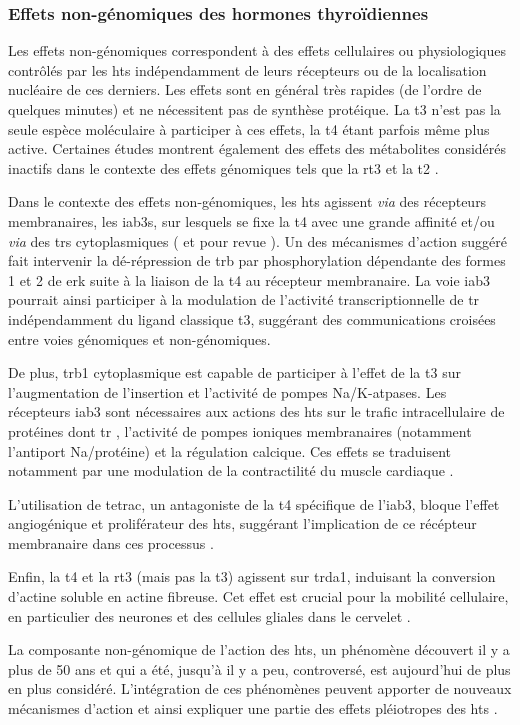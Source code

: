 \documentclass[../main.tex]{subfiles}
\begin{document}
		\subsubsection{Effets non-génomiques des hormones thyroïdiennes}
			Les effets non-génomiques correspondent à des effets cellulaires ou physiologiques contrôlés par les \glspl{ht} indépendamment de leurs récepteurs ou de la localisation nucléaire de ces derniers.
			Les effets sont en général très rapides (de l'ordre de quelques minutes) et ne nécessitent pas de synthèse protéique.
			La \gls{t3} n'est pas la seule espèce moléculaire à participer à ces effets, la \gls{t4} étant parfois même plus active.
			Certaines études montrent également des effets des métabolites considérés inactifs dans le contexte des effets génomiques tels que la \gls{rt3} \citep{Siegrist-Kaiser1990} et la \gls{t2} \citep{Lombardi1998}.
			\par
			Dans le contexte des effets non-génomiques, les \glspl{ht} agissent \textit{via} des récepteurs membranaires, les \glspl{iab3}, sur lesquels se fixe la \gls{t4} avec une grande affinité et/ou \textit{via} des \glspl{tr} cytoplasmiques (\citealp{Bergh2005} et pour revue \citealp{Davis2008}).
			Un des mécanismes d'action suggéré fait intervenir la dé-répression de \gls{trb} par phosphorylation dépendante des formes 1 et 2 de \gls{erk} \citep{Davis2000} suite à la liaison de la \gls{t4} au récepteur membranaire.
			La voie \gls{iab3} pourrait ainsi participer à la modulation de l'activité transcriptionnelle de \gls{tr} indépendamment du ligand classique \gls{t3}, suggérant des communications croisées entre voies génomiques et non-génomiques.
			\par
			De plus, \gls{trb}1 cytoplasmique est capable de participer à l'effet de la \gls{t3} sur l'augmentation de l'insertion et l'activité de pompes \gls{Na}/\gls{K}-\gls{atp}ases.
			Les récepteurs \gls{iab3} sont nécessaires aux actions des \glspl{ht} sur le trafic intracellulaire de protéines dont \gls{tr} \citep{Davis2005}, l'activité de pompes ioniques membranaires (notamment l'antiport \gls{Na}/protéine) et la régulation calcique.
			Ces effets se traduisent notamment par une modulation de la contractilité du muscle cardiaque \citep{Davis2002}.
			\par
			L'utilisation de \gls{tetrac}, un antagoniste de la \gls{t4} spécifique de l'\gls{iab3}, bloque l'effet angiogénique et proliférateur des \glspl{ht}, suggérant l'implication de ce récépteur membranaire dans ces processus \citep{Davis2011}.
			\par
			Enfin, la \gls{t4} et la \gls{rt3} (mais pas la \gls{t3}) agissent sur \gls{trda}1, induisant la conversion d'actine soluble en actine fibreuse.
			Cet effet est crucial pour la mobilité cellulaire, en particulier des neurones et des cellules gliales dans le cervelet \citep{Safran1993,Leonard2006}.
			\par
			La composante non-génomique de l'action des \glspl{ht}, un phénomène découvert il y a plus de 50 ans et qui a été, jusqu'à il y a peu, controversé, est aujourd'hui de plus en plus considéré.
			L'intégration de ces phénomènes peuvent apporter de nouveaux mécanismes d'action et ainsi expliquer une partie des effets pléiotropes des \glspl{ht} \citep{Brix2011}.
\end{document}
